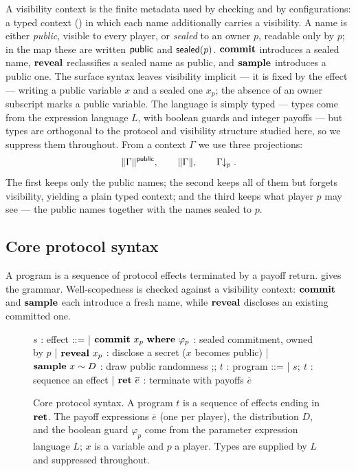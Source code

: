 A visibility context is the finite metadata used by checking and by
configurations: a typed context () in which
each name additionally carries a visibility.  A name is either
\emph{public}, visible to every player, or \emph{sealed} to an owner
\(p\), readable only by \(p\); in the map these are written \(\mathsf{public}\) and
\(\mathsf{sealed}(p)\).  \(\mathbf{commit}\) introduces a sealed name, \(\mathbf{reveal}\)
reclassifies a sealed name as public, and \(\mathbf{sample}\) introduces a public
one.  The surface syntax leaves visibility implicit
--- it is fixed by the effect --- writing a public variable \(x\) and a
sealed one \(x_p\); the absence of an owner subscript marks a public
variable.  The language is simply typed --- types come from the
expression language \(L\), with boolean guards and integer payoffs ---
but types are orthogonal to the protocol and visibility structure studied
here, so we suppress them throughout.  From a context \(\Gamma\) we use
three projections:
\[
  \| \Gamma \|^{\mathsf{public}}, \qquad
  \| \Gamma \|, \qquad
  \Gamma\!\!\downarrow_{p}.
\]
The first keeps only the public names; the second keeps all of them but
forgets visibility, yielding a plain typed context; and the third keeps
what player \(p\) may see --- the public names together with the names
sealed to \(p\).

\subsection{Core protocol syntax}

A program is a sequence of protocol effects terminated by a payoff
return.   gives the grammar.  Well-scopedness is
checked against a visibility context: \(\mathbf{commit}\) and
\(\mathbf{sample}\) each introduce a fresh name, while \(\mathbf{reveal}\) discloses an
existing committed one.

\begin{figure}[t]
\centering
\begin{bnf}
$s$ : \textsf{effect} ::=
  | $\mathbf{commit}~x_p~\mathbf{where}~\varphi_p$ : sealed commitment, owned by \(p\)
  | $\mathbf{reveal}~x_p$ : disclose a secret (\(x\) becomes public)
  | $\mathbf{sample}~x \sim D$ : draw public randomness
;;
$t$ : \textsf{program} ::=
  | $s;~t$ : sequence an effect
  | $\mathbf{ret}~\overline{e}$ : terminate with payoffs \(\overline{e}\)
\end{bnf}
\caption{Core protocol syntax. A program \(t\) is a sequence of effects
ending in \(\mathbf{ret}\). The payoff expressions \(\overline{e}\) (one per
player), the distribution \(D\), and the boolean guard \(\varphi_p\) come
from the parameter expression language \(L\); \(x\) is a variable and
\(p\) a player. Types are supplied by \(L\) and suppressed throughout.}
\label{fig:vegas-syntax}
\end{figure}

